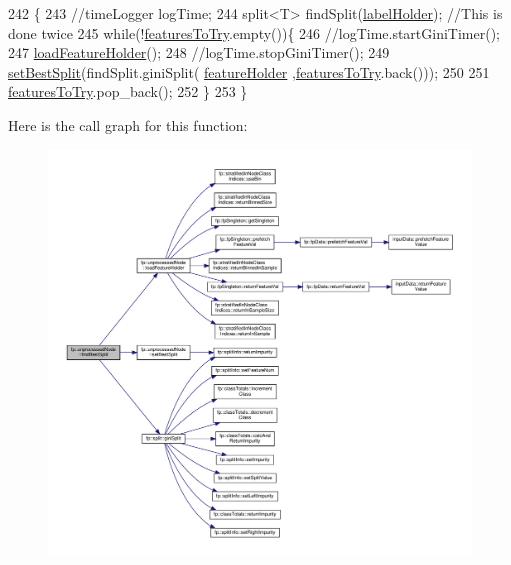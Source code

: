 \begin{DoxyCode}
242                                            \{
243                     \textcolor{comment}{//timeLogger logTime;}
244                     split<T> findSplit(\hyperlink{classfp_1_1unprocessedNode_a99524f9266d6fcf979f15ef445e629ca}{labelHolder}); \textcolor{comment}{//This is done twice}
245                     \textcolor{keywordflow}{while}(!\hyperlink{classfp_1_1unprocessedNode_a3cffd07402568c03834d0a1248f3a6e3}{featuresToTry}.empty())\{
246                     \textcolor{comment}{//logTime.startGiniTimer();}
247                         \hyperlink{classfp_1_1unprocessedNode_a8cedeb8c4c88345ff97f9afb89b3ccd0}{loadFeatureHolder}();
248                     \textcolor{comment}{//logTime.stopGiniTimer();}
249                         \hyperlink{classfp_1_1unprocessedNode_ae7ad0b6bf8142ea5d3d851e29b5b9aee}{setBestSplit}(findSplit.giniSplit(
      \hyperlink{classfp_1_1unprocessedNode_adbc4f28ec96b3ac3690cd28e71274bc5}{featureHolder} ,\hyperlink{classfp_1_1unprocessedNode_a3cffd07402568c03834d0a1248f3a6e3}{featuresToTry}.back()));
250     
251                         \hyperlink{classfp_1_1unprocessedNode_a3cffd07402568c03834d0a1248f3a6e3}{featuresToTry}.pop\_back();
252                     \}
253                 \}
\end{DoxyCode}
Here is the call graph for this function\+:\nopagebreak
\begin{figure}[H]
\begin{center}
\leavevmode
\includegraphics[width=350pt]{classfp_1_1unprocessedNode_a5fea1583d2250e14470d92568b57e60c_cgraph}
\end{center}
\end{figure}
\mbox{\label{classfp_1_1unprocessedNode_ad4ffdb4f4b91d6d21f8954f3c80a3617}} 
